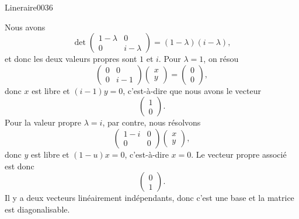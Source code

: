 \begin{corrige}{Lineraire0036}

	Nous avons
	\begin{equation}
		\det\begin{pmatrix}
			1-\lambda	&	0	\\ 
			0	&	i-\lambda	
		\end{pmatrix}=(1-\lambda)(i-\lambda),
	\end{equation}
	et donc les deux valeurs propres sont $1$ et $i$. Pour $\lambda=1$, on résou
	\begin{equation}
		\begin{pmatrix}
			0	&	0	\\ 
			0	&	i-1	
		\end{pmatrix}\begin{pmatrix}
			x	\\ 
			y	
		\end{pmatrix}=\begin{pmatrix}
			0	\\ 
			0	
		\end{pmatrix},
	\end{equation}
	donc $x$ est libre et $(i-1)y=0$, c'est-à-dire que nous avons le vecteur
	\begin{equation}
		\begin{pmatrix}
			1	\\ 
			0	
		\end{pmatrix}.
	\end{equation}
	Pour la valeur propre $\lambda=i$, par contre, nous résolvons
	\begin{equation}
		\begin{pmatrix}
			1-i	&	0	\\ 
			0	&	0	
		\end{pmatrix}\begin{pmatrix}
			x	\\ 
			y	
		\end{pmatrix},
	\end{equation}
	donc $y$ est libre et $(1-u)x=0$, c'est-à-dire $x=0$. Le vecteur propre associé est donc
	\begin{equation}
		\begin{pmatrix}
			0	\\ 
			1	
		\end{pmatrix}.
	\end{equation}
	Il y a deux vecteurs linéairement indépendants, donc c'est une base et la matrice est diagonalisable.


\end{corrige}
